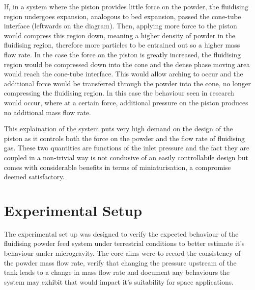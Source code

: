 If, in a system where the piston provides little force on the powder, the fluidising region undergoes expansion, analogous to bed expansion, passed the cone-tube interface (leftwards on the diagram). Then, applying more force to the piston would compress this region down, meaning a higher density of powder in the fluidising region, therefore more particles to be entrained out so a higher mass flow rate. In the case the force on the piston is greatly increased, the fluidising region would be compressed down into the cone and the dense phase moving area would reach the cone-tube interface. This would allow arching to occur and the additional force would be transferred through the powder into the cone, no longer compressing the fluidising region. In this case the behaviour seen in research would occur, where at a certain force, additional pressure on the piston produces no additional mass flow rate. 

This explaination of the system puts very high demand on the design of the piston as it controls both the force on the powder and the flow rate of fluidising gas. These two quantities are functions of the inlet pressure and the fact they are coupled in a non-trivial way is not condusive of an easily controllabile design but comes with considerable benefits in terms of miniaturisation, a compromise deemed satisfactory.

\section{Experimental Setup}
The experimental set up was designed to verify the expected behaviour of the fluidising powder feed system under terrestrial conditions to better estimate it's behaviour under microgravity. The core aims were to record the consistency of the powder mass flow rate, verify that changing the pressure upstream of the tank leads to a change in mass flow rate and document any behaviours the system may exhibit that would impact it's suitability for space applications.

